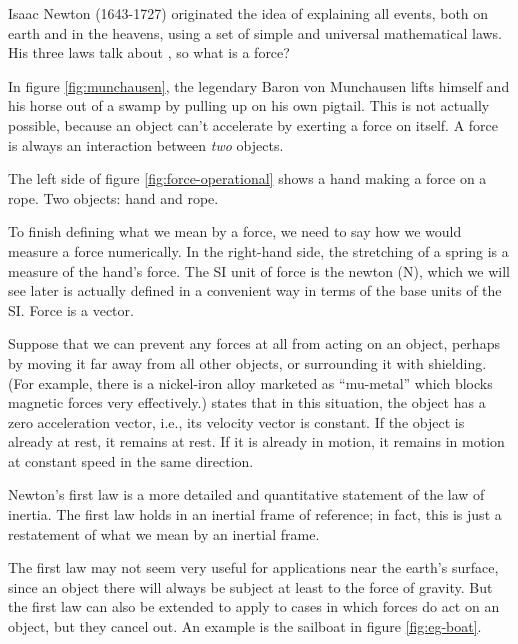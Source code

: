Isaac Newton (1643-1727) originated the idea of explaining all events, both on earth and
in the heavens, using a set of simple and universal mathematical laws. His three laws
talk about , so what is a force?

In figure \ref{fig:munchausen}, the legendary Baron von Munchausen lifts himself and
his horse out of a swamp by pulling up on his own pigtail. 
This is not actually possible, because an object can't accelerate by exerting a force
on itself. A force is always an interaction between \emph{two} objects.


The left side of figure \ref{fig:force-operational} shows a hand making a force on a
rope. Two objects: hand and rope.

To finish defining what we mean by a force, we need to say how we would measure a
force numerically. In the right-hand side,
the stretching of a spring is a measure of the hand's force. The SI unit of force is
the newton (N), which we will see later is actually defined in a convenient way in terms
of the base units of the SI. Force is a vector.


Suppose that we can prevent any forces at all from acting on an object, perhaps by
moving it far away from all other objects, or surrounding it with shielding. (For example,
there is a nickel-iron alloy marketed as ``mu-metal'' which blocks magnetic forces very effectively.)
 states that in this situation,
the object has a zero acceleration vector, i.e., its velocity vector is constant.
If the object is already at rest, it remains at rest. If it is already in motion, it
remains in motion at constant speed in the same direction.

Newton's first law is a more detailed and quantitative statement of the law of inertia.
The first law holds in an inertial frame of reference; in fact, this is just a restatement
of what we mean by an inertial frame.


The first law may not seem very useful for applications near the earth's surface, since
an object there will always be subject at least to the force of gravity. But the first
law can also be extended to apply to cases in which forces do act on an object, but they
cancel out. An example is the sailboat in figure \ref{fig:eg-boat}.

